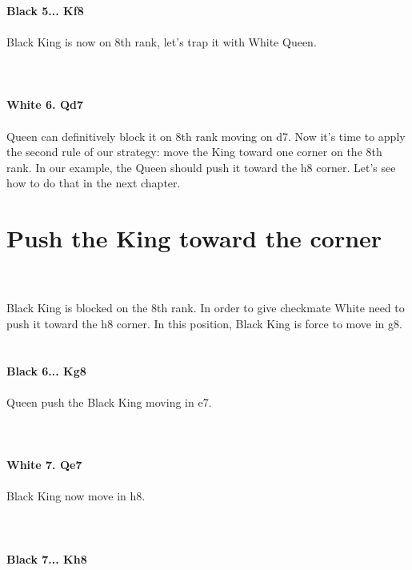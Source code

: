 \documentclass{article}
\begin{document}
\\

\\
\\
\textbf{Black 5... Kf8}\\
\\
Black King is now on 8th rank, let's trap it with White Queen.\\
\\

\\
\\
\textbf{White 6. Qd7}\\
\\
Queen can definitively block it on 8th rank moving on d7. Now it's time to apply the second rule of our strategy: move the King toward one corner on the 8th rank. In our example, the Queen should push it toward the h8 corner. Let's see how to do that in the next chapter.\\\section{ Push the King toward the corner}

\\
\\
Black King is blocked on the 8th rank. In order to give checkmate White need to push it toward the h8 corner. In this position, Black King is force to move in g8.\\

\\
\\
\textbf{Black 6... Kg8}\\
\\
Queen push the Black King moving in e7.\\
\\

\\
\\
\textbf{White 7. Qe7}\\
\\
Black King now move in h8.\\
\\

\\
\\
\textbf{Black 7... Kh8}\\
\end{document}
